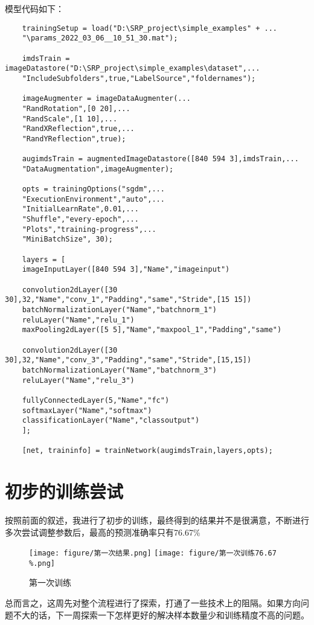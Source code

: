 \documentclass{article}
\begin{document}
	模型代码如下：
	\begin{lstlisting}
	trainingSetup = load("D:\SRP_project\simple_examples" + ...
	"\params_2022_03_06__10_51_30.mat");
	
	imdsTrain = imageDatastore("D:\SRP_project\simple_examples\dataset",...
	"IncludeSubfolders",true,"LabelSource","foldernames");
	
	imageAugmenter = imageDataAugmenter(...
	"RandRotation",[0 20],...
	"RandScale",[1 10],...
	"RandXReflection",true,...
	"RandYReflection",true);
	
	augimdsTrain = augmentedImageDatastore([840 594 3],imdsTrain,...
	"DataAugmentation",imageAugmenter);
	
	opts = trainingOptions("sgdm",...
	"ExecutionEnvironment","auto",...
	"InitialLearnRate",0.01,...
	"Shuffle","every-epoch",...
	"Plots","training-progress",...
	"MiniBatchSize", 30);
	
	layers = [
	imageInputLayer([840 594 3],"Name","imageinput")
	
	convolution2dLayer([30 30],32,"Name","conv_1","Padding","same","Stride",[15 15])
	batchNormalizationLayer("Name","batchnorm_1")
	reluLayer("Name","relu_1")
	maxPooling2dLayer([5 5],"Name","maxpool_1","Padding","same")
	
	convolution2dLayer([30 30],32,"Name","conv_3","Padding","same","Stride",[15,15])
	batchNormalizationLayer("Name","batchnorm_3")
	reluLayer("Name","relu_3")
	
	fullyConnectedLayer(5,"Name","fc")
	softmaxLayer("Name","softmax")
	classificationLayer("Name","classoutput")
	];
	
	[net, traininfo] = trainNetwork(augimdsTrain,layers,opts);
	\end{lstlisting}
	
	\section{初步的训练尝试}
	
	按照前面的叙述，我进行了初步的训练，最终得到的结果并不是很满意，不断进行多次尝试调整参数后，最高的预测准确率只有76.67\%
	
	\begin{figure}[h]
		\centering
		\texttt{[image: figure/第一次结果.png]}
		\quad
		\texttt{[image: figure/第一次训练76.67\\\%.png]}
		\caption{第一次训练}
	\end{figure}

	总而言之，这周先对整个流程进行了探索，打通了一些技术上的阻隔。如果方向问题不大的话，下一周探索一下怎样更好的解决样本数量少和训练精度不高的问题。
	
\end{document}
